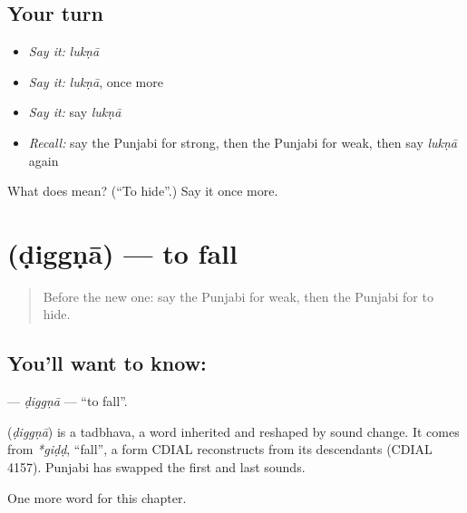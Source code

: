 \subsection*{Your turn}
\begin{itemize}
\raggedright
  \item \emph{Say it:} \emph{lukṇā}
  \item \emph{Say it:} \emph{lukṇā}, once more
  \item \emph{Say it:} say \emph{lukṇā}
  \item \emph{Recall:} say the Punjabi for strong, then the Punjabi for weak, then say \emph{lukṇā} again
\end{itemize}

\begin{tcolorbox}[breakable,colback=teal!4,colframe=teal!35!black,title={Before you move on}]
What does  mean? (\textquotedblleft{}To hide\textquotedblright{}.) Say it once more.
\end{tcolorbox}
\section[\texorpdfstring{\pa{ਡਿੱਗਣਾ} (ḍiggṇā)}{ਡਿੱਗਣਾ (ḍiggṇā)}]{ (ḍiggṇā) — to fall}

\label{lesson:PA-C148-diggna}



\begin{quote}
Before the new one: say the Punjabi for weak, then the Punjabi for to hide.
\end{quote}

\subsection*{You'll want to know: }
\textbf{} — \emph{ḍiggṇā} — \textquotedblleft{}to fall\textquotedblright{}.

\begin{cousinweb}
\textbf{} (\emph{ḍiggṇā}) is a tadbhava, a word inherited and reshaped by sound change. It comes from \emph{*giḍḍ}, \textquotedblleft{}fall\textquotedblright{}, a form CDIAL reconstructs from its descendants (CDIAL 4157). Punjabi has swapped the first and last sounds.
\end{cousinweb}

\begin{grammarlens}[title={What you've built}]
One more word for this chapter.
\end{grammarlens}


